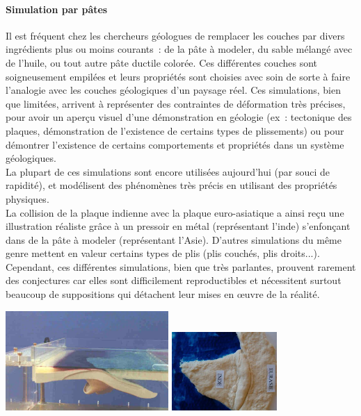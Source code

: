 \documentclass[a4paper,11pt]{article}
\begin{document}
\paragraph{Simulation par pâtes}
\medbreak
Il est fréquent chez les chercheurs géologues de remplacer les couches par divers ingrédients plus ou moins courants~: de la pâte à modeler, du sable mélangé avec de l'huile, ou tout autre pâte ductile colorée.
Ces différentes couches sont soigneusement empilées et leurs propriétés sont choisies avec soin de sorte à faire l'analogie avec les couches géologiques d'un paysage réel.
Ces simulations, bien que limitées, arrivent à représenter des contraintes de déformation très précises, pour avoir un aperçu visuel d'une démonstration en géologie (ex~: tectonique des plaques, démonstration de l'existence de certains types de plissements) ou pour démontrer l'existence de certains comportements et propriétés dans un système géologiques.\\
La plupart de ces simulations sont encore utilisées aujourd'hui (par souci de rapidité), et modélisent des phénomènes très précis en utilisant des propriétés physiques.\\
La collision de la plaque indienne avec la plaque euro-asiatique a ainsi reçu une illustration réaliste grâce à un pressoir en métal (représentant l'inde) s'enfonçant dans de la pâte à modeler (représentant l'Asie).
D'autres simulations du même genre mettent en valeur certains types de plis (plis couchés, plis droits...). Cependant, ces différentes simulations, bien que très parlantes, prouvent rarement des conjectures car elles sont difficilement reproductibles et nécessitent surtout beaucoup de suppositions qui détachent leur mises en œuvre de la réalité.

\begin{center}
  \includegraphics[width=6.2cm]{Images/simulation_physique.png}
  \includegraphics[width=4cm, angle=90]{Images/inde.jpg}
\end{center}
\end{document}
